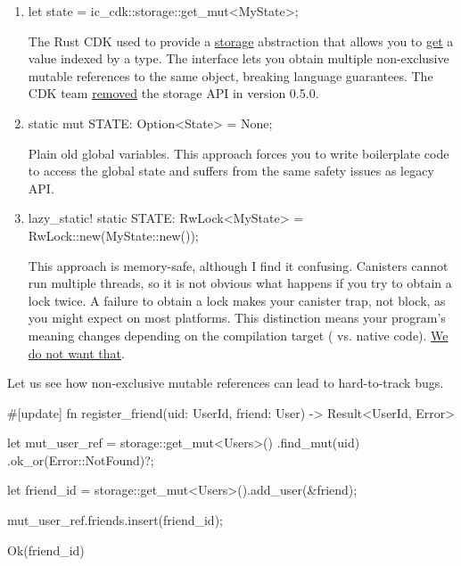 \documentclass{article}
\begin{document}
\begin{enumerate}
\item 
\begin{code}[bad]
let state = ic_cdk::storage::get_mut<MyState>;
\end{code}

The Rust CDK used to provide a \href{https://docs.rs/ic-cdk/0.3.2/ic_cdk/storage/index.html}{storage} abstraction that allows you to \href{https://docs.rs/ic-cdk/0.3.2/ic_cdk/storage/fn.get_mut.html}{get} a value indexed by a type.
The interface lets you obtain multiple non-exclusive mutable references to the same object, breaking language guarantees.
The CDK team \href{https://github.com/dfinity/cdk-rs/blob/c7aaaddaaf5e39c90a51035f87be68a0215c8c10/src/ic-cdk/CHANGELOG.md#changed-2}{removed} the storage API in version 0.5.0.

\item 
\begin{code}[bad]
static mut STATE: Option<State> = None;
\end{code}

Plain old global variables.
This approach forces you to write boilerplate code to access the global state and suffers from the same safety issues as legacy  API.

\item 
\begin{code}[bad]
lazy_static! {
    static STATE: RwLock<MyState> = RwLock::new(MyState::new());
}
\end{code}

This approach is memory-safe, although I find it confusing.
Canisters cannot run multiple threads, so it is not obvious what happens if you try to obtain a lock twice.
A failure to obtain a lock makes your canister trap, not block, as you might expect on most platforms.
This distinction means your program's meaning changes depending on the compilation target ( vs. native code).
\href{#target-independent}{We do not want that}.
\end{enumerate}

Let us see how non-exclusive mutable references can lead to hard-to-track bugs.

\begin{code}[bad]
#[update]
fn register_friend(uid: UserId, friend: User) -> Result<UserId, Error> {
    let mut_user_ref = storage::get_mut<Users>() 
                           .find_mut(uid)
                           .ok_or(Error::NotFound)?;

    let friend_id = storage::get_mut<Users>().add_user(&friend); 

    mut_user_ref.friends.insert(friend_id); 

    Ok(friend_id)
}
\end{code}
\end{document}
